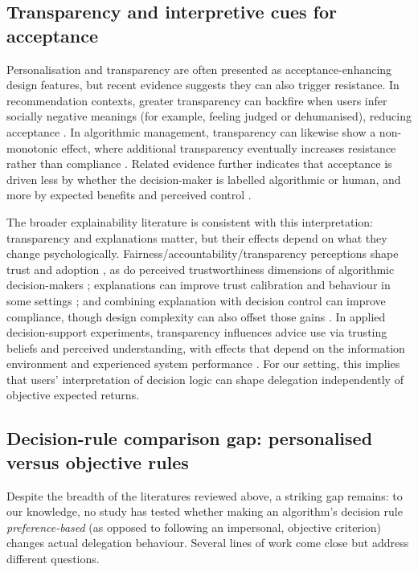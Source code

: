 \documentclass[a4paper, 12pt, fleqn]{article}
\theoremstyle{hypstyle}
\begin{document}
\subsection{Transparency and interpretive cues for acceptance}
Personalisation and transparency are often presented as acceptance-enhancing design features, but recent evidence suggests they can also trigger resistance. In recommendation contexts, greater transparency can backfire when users infer socially negative meanings (for example, feeling judged or dehumanised), reducing acceptance \citep{Chen2024}. In algorithmic management, transparency can likewise show a non-monotonic effect, where additional transparency eventually increases resistance rather than compliance \citep{Hu2024}. Related evidence further indicates that acceptance is driven less by whether the decision-maker is labelled algorithmic or human, and more by expected benefits and perceived control \citep{Schaap2024}.

The broader explainability literature is consistent with this interpretation: transparency and explanations matter, but their effects depend on what they change psychologically. Fairness/accountability/transparency perceptions shape trust and adoption \citep{Shin2019}, as do perceived trustworthiness dimensions of algorithmic decision-makers \citep{Hoeddinghaus2021}; explanations can improve trust calibration and behaviour in some settings \citep{Leichtmann2023}; and combining explanation with decision control can improve compliance, though design complexity can also offset those gains \citep{Westphal2023}. In applied decision-support experiments, transparency influences advice use via trusting beliefs and perceived understanding, with effects that depend on the information environment and experienced system performance \citep{Ning2024,Sun2026}. For our setting, this implies that users' interpretation of decision logic can shape delegation independently of objective expected returns.

\subsection{Decision-rule comparison gap: personalised versus objective rules}
Despite the breadth of the literatures reviewed above, a striking gap remains: to our knowledge, no study has tested whether making an algorithm's decision rule \emph{preference-based} (as opposed to following an impersonal, objective criterion) changes actual delegation behaviour. Several lines of work come close but address different questions.
\end{document}
